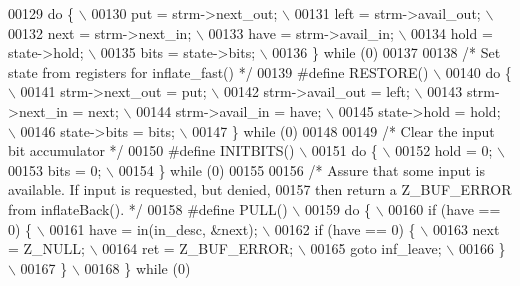 \begin{DoxyCode}
00129 \textcolor{preprocessor}{    do \{ \(\backslash\)}
00130 \textcolor{preprocessor}{        put = strm->next\_out; \(\backslash\)}
00131 \textcolor{preprocessor}{        left = strm->avail\_out; \(\backslash\)}
00132 \textcolor{preprocessor}{        next = strm->next\_in; \(\backslash\)}
00133 \textcolor{preprocessor}{        have = strm->avail\_in; \(\backslash\)}
00134 \textcolor{preprocessor}{        hold = state->hold; \(\backslash\)}
00135 \textcolor{preprocessor}{        bits = state->bits; \(\backslash\)}
00136 \textcolor{preprocessor}{    \} while (0)}
00137 
00138 \textcolor{comment}{/* Set state from registers for inflate\_fast() */}
00139 \textcolor{preprocessor}{#define RESTORE() \(\backslash\)}
00140 \textcolor{preprocessor}{    do \{ \(\backslash\)}
00141 \textcolor{preprocessor}{        strm->next\_out = put; \(\backslash\)}
00142 \textcolor{preprocessor}{        strm->avail\_out = left; \(\backslash\)}
00143 \textcolor{preprocessor}{        strm->next\_in = next; \(\backslash\)}
00144 \textcolor{preprocessor}{        strm->avail\_in = have; \(\backslash\)}
00145 \textcolor{preprocessor}{        state->hold = hold; \(\backslash\)}
00146 \textcolor{preprocessor}{        state->bits = bits; \(\backslash\)}
00147 \textcolor{preprocessor}{    \} while (0)}
00148 
00149 \textcolor{comment}{/* Clear the input bit accumulator */}
00150 \textcolor{preprocessor}{#define INITBITS() \(\backslash\)}
00151 \textcolor{preprocessor}{    do \{ \(\backslash\)}
00152 \textcolor{preprocessor}{        hold = 0; \(\backslash\)}
00153 \textcolor{preprocessor}{        bits = 0; \(\backslash\)}
00154 \textcolor{preprocessor}{    \} while (0)}
00155 
00156 \textcolor{comment}{/* Assure that some input is available.  If input is requested, but denied,}
00157 \textcolor{comment}{   then return a Z\_BUF\_ERROR from inflateBack(). */}
00158 \textcolor{preprocessor}{#define PULL() \(\backslash\)}
00159 \textcolor{preprocessor}{    do \{ \(\backslash\)}
00160 \textcolor{preprocessor}{        if (have == 0) \{ \(\backslash\)}
00161 \textcolor{preprocessor}{            have = in(in\_desc, &next); \(\backslash\)}
00162 \textcolor{preprocessor}{            if (have == 0) \{ \(\backslash\)}
00163 \textcolor{preprocessor}{                next = Z\_NULL; \(\backslash\)}
00164 \textcolor{preprocessor}{                ret = Z\_BUF\_ERROR; \(\backslash\)}
00165 \textcolor{preprocessor}{                goto inf\_leave; \(\backslash\)}
00166 \textcolor{preprocessor}{            \} \(\backslash\)}
00167 \textcolor{preprocessor}{        \} \(\backslash\)}
00168 \textcolor{preprocessor}{    \} while (0)}

\end{DoxyCode}
